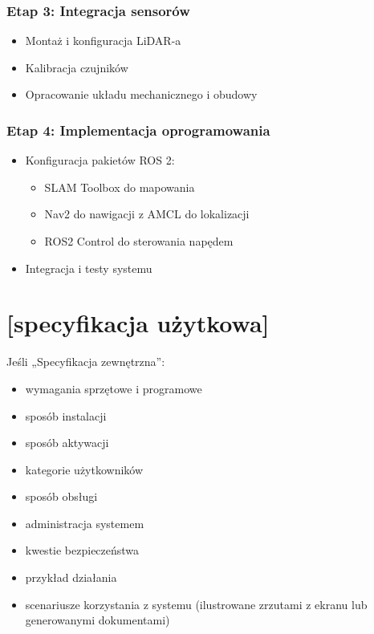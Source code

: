 \documentclass[a4paper,twoside,12pt]{book}
\begin{document}
\subsection{Etap 3: Integracja sensorów}
\begin{itemize}
\item Montaż i konfiguracja LiDAR-a
\item Kalibracja czujników
\item Opracowanie układu mechanicznego i obudowy
\end{itemize}

\subsection{Etap 4: Implementacja oprogramowania}
\begin{itemize}
\item Konfiguracja pakietów ROS 2:
	\begin{itemize}
	\item SLAM Toolbox do mapowania
	\item Nav2 do nawigacji z AMCL do lokalizacji
	\item ROS2 Control do sterowania napędem
	\end{itemize}
\item Integracja i testy systemu
\end{itemize}



\chapter{[specyfikacja użytkowa]}
\label{ch:04}

Jeśli „Specyfikacja zewnętrzna”:
\begin{itemize}
\item  wymagania sprzętowe i programowe
\item  sposób instalacji
\item  sposób aktywacji
\item  kategorie użytkowników
\item  sposób obsługi
\item  administracja systemem
\item  kwestie bezpieczeństwa
\item  przykład działania
\item  scenariusze korzystania z systemu (ilustrowane zrzutami z ekranu lub generowanymi dokumentami)
\end{itemize}
\end{document}
